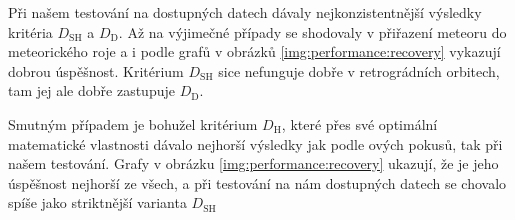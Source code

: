 \medskip

Při našem testování na dostupných datech dávaly nejkonzistentnější výsledky kritéria $D_\text{SH}$ a $D_\text{D}$. Až na výjimečné případy se shodovaly v přiřazení meteoru do meteorického roje a i podle grafů v obrázků \ref{img:performance:recovery} vykazují dobrou úspěšnost. Kritérium $D_\text{SH}$ sice nefunguje dobře v retrográdních orbitech, tam jej ale dobře zastupuje $D_\text{D}$.

\medskip

Smutným případem je bohužel kritérium $D_\text{H}$, které přes své optimální matematické vlastnosti dávalo nejhorší výsledky jak podle \citeauthor{galligan}ových pokusů, tak při našem testování. Grafy v obrázku \ref{img:performance:recovery} ukazují, že je jeho úspěšnost nejhorší ze všech, a při testování na nám dostupných datech se chovalo spíše jako striktnější varianta $D_\text{SH}$